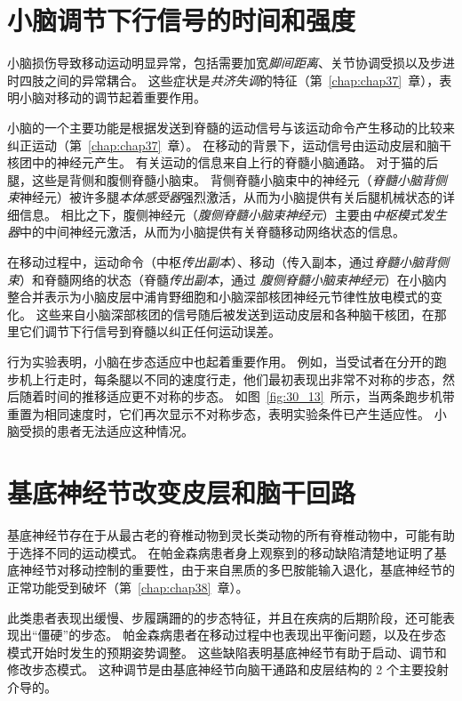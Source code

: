\section{小脑调节下行信号的时间和强度}

小脑损伤导致移动运动明显异常，包括需要加宽\textit{脚间距离}、关节协调受损以及步进时四肢之间的异常耦合。
这些症状是\textit{共济失调}的特征（第~\ref{chap:chap37}~章），表明小脑对移动的调节起着重要作用。


小脑的一个主要功能是根据发送到脊髓的运动信号与该运动命令产生移动的比较来纠正运动（第~\ref{chap:chap37}~章）。
在移动的背景下，运动信号由运动皮层和脑干核团中的神经元产生。
有关运动的信息来自上行的脊髓小脑通路。
对于猫的后腿，这些是背侧和腹侧脊髓小脑束。
背侧脊髓小脑束中的神经元（\textit{脊髓小脑背侧束}神经元）被许多腿\textit{本体感受器}强烈激活，从而为小脑提供有关后腿机械状态的详细信息。
相比之下，腹侧神经元（\textit{腹侧脊髓小脑束神经元}）主要由\textit{中枢模式发生器}中的中间神经元激活，从而为小脑提供有关脊髓移动网络状态的信息。


在移动过程中，运动命令（中枢\textit{传出副本}）、移动（传入副本，通过\textit{脊髓小脑背侧束}）和脊髓网络的状态（脊髓\textit{传出副本}，通过 \textit{腹侧脊髓小脑束神经元}）在小脑内整合并表示为小脑皮层中浦肯野细胞和小脑深部核团神经元节律性放电模式的变化。
这些来自小脑深部核团的信号随后被发送到运动皮层和各种脑干核团，在那里它们调节下行信号到脊髓以纠正任何运动误差。


行为实验表明，小脑在步态适应中也起着重要作用。
例如，当受试者在分开的跑步机上行走时，每条腿以不同的速度行走，他们最初表现出非常不对称的步态，然后随着时间的推移适应更不对称的步态。
如图~\ref{fig:30_13}~所示，当两条跑步机带重置为相同速度时，它们再次显示不对称步态，表明实验条件已产生适应性。
小脑受损的患者无法适应这种情况。



\section{基底神经节改变皮层和脑干回路}

基底神经节存在于从最古老的脊椎动物到灵长类动物的所有脊椎动物中，可能有助于选择不同的运动模式。
在帕金森病患者身上观察到的移动缺陷清楚地证明了基底神经节对移动控制的重要性，由于来自黑质的多巴胺能输入退化，基底神经节的正常功能受到破坏（第~\ref{chap:chap38}~章）。


此类患者表现出缓慢、步履蹒跚的的步态特征，并且在疾病的后期阶段，还可能表现出“僵硬”的步态。
帕金森病患者在移动过程中也表现出平衡问题，以及在步态模式开始时发生的预期姿势调整。
这些缺陷表明基底神经节有助于启动、调节和修改步态模式。
这种调节是由基底神经节向脑干通路和皮层结构的 2 个主要投射介导的。


